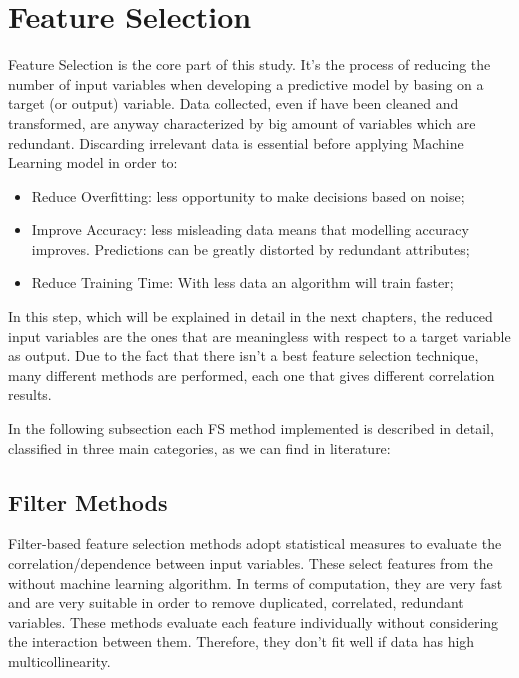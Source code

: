 \section{Feature Selection}
Feature Selection is the core part of this study. It's the process of reducing the number of input variables when developing a predictive model by basing on a target (or output) variable. 
Data collected, even if have been cleaned and transformed, are anyway characterized by big amount of variables which are redundant.
Discarding irrelevant data is essential before applying Machine Learning model in order to:
\begin{itemize}
\item Reduce Overfitting: less opportunity to make decisions based on noise;
\item Improve Accuracy: less misleading data means that modelling accuracy improves. Predictions can be greatly distorted by redundant attributes;
\item Reduce Training Time: With less data an algorithm will train faster;
\end{itemize}
In this step, which will be explained in detail in the next chapters, the reduced input variables are the ones that are meaningless with respect to a target variable as output. \newline
Due to the fact that there isn’t a best feature selection technique, many different methods are performed, each one that gives different correlation results.\par
In the following subsection each FS method implemented is described in detail, classified in three main categories\cite{stanczyk2015feature}, as we can find in literature:
\subsection{Filter Methods}
Filter-based feature selection methods adopt statistical measures to evaluate the correlation/dependence between input variables.\newline
These select features from the without machine learning algorithm. In terms of computation, they are very fast and are very suitable in order to remove duplicated, correlated, redundant variables\cite{saeys2007review}. \newline
These methods evaluate each feature individually without considering the interaction between them. Therefore, they don't fit well if data has high multicollinearity\cite{daoud2017multicollinearity}.

